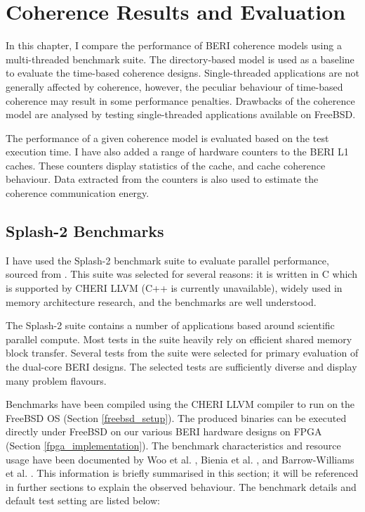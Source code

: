 \makeatletter
\makeatother
\ifpdf
\graphicspath{{Results/ResultsFigs/PNG/}{Results/ResultsFigs/PDF/}{Results/ResultsFigs/}}
\else
\graphicspath{{Results/ResultsFigs/EPS/}{Results/ResultsFigs/}}
\fi

\chapter{Coherence Results and Evaluation}
\label{coherence_eval}
	In this chapter, I compare the performance of BERI coherence models using a multi-threaded benchmark suite. The directory-based model is used as a baseline to evaluate the time-based coherence designs. Single-threaded applications are not generally affected by coherence, however, the peculiar behaviour of time-based coherence may result in some performance penalties. Drawbacks of the coherence model are analysed by testing single-threaded applications available on FreeBSD.
	
	The performance of a given coherence model is evaluated based on the test execution time. I have also added a range of hardware counters to the BERI L1 caches. These counters display statistics of the cache, and cache coherence behaviour. Data extracted from the counters is also used to estimate the coherence communication energy.

\section{Splash-2 Benchmarks}
	I have used the Splash-2 benchmark suite to evaluate parallel performance, sourced from \cite{splash2_0,splash2_1,splash2_2}. This suite was selected for several reasons: it is written in C which is supported by CHERI LLVM (C++ is currently unavailable), widely used in memory architecture research, and the benchmarks are well understood.

	The Splash-2 suite contains a number of applications based around scientific parallel compute. Most tests in the suite heavily rely on efficient shared memory block transfer. Several tests from the suite were selected for primary evaluation of the dual-core BERI designs. The selected tests are sufficiently diverse and display many problem flavours. 

	Benchmarks have been compiled using the CHERI LLVM compiler to run on the FreeBSD OS (Section \ref{freebsd_setup}). The produced binaries can be executed directly under FreeBSD on our various BERI hardware designs on FPGA (Section \ref{fpga_implementation}). The benchmark characteristics and resource usage have been documented by Woo et al. \cite{Woo95}, Bienia et al. \cite{Bienia08}, and Barrow-Williams et al. \cite{Barrow-Williams09}. This information is briefly summarised in this section; it will be referenced in further sections to explain the  observed behaviour. The benchmark details and default test setting are listed below:
			

